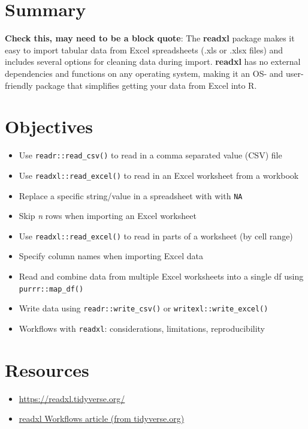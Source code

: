 \documentclass[]{book}
\providecommand{\tightlist}{%
  \setlength{\itemsep}{0pt}\setlength{\parskip}{0pt}}
\begin{document}
\hypertarget{summary}{%
\section{Summary}\label{summary}}

\textbf{Check this, may need to be a block quote}: The \textbf{readxl} package makes it easy to import tabular data from Excel spreadsheets (.xls or .xlsx files) and includes several options for cleaning data during import. \textbf{readxl} has no external dependencies and functions on any operating system, making it an OS- and user-friendly package that simplifies getting your data from Excel into R.

\hypertarget{objectives}{%
\section{Objectives}\label{objectives}}

\begin{itemize}
\tightlist
\item
  Use \texttt{readr::read\_csv()} to read in a comma separated value (CSV) file
\item
  Use \texttt{readxl::read\_excel()} to read in an Excel worksheet from a workbook
\item
  Replace a specific string/value in a spreadsheet with with \texttt{NA}
\item
  Skip \emph{n} rows when importing an Excel worksheet
\item
  Use \texttt{readxl::read\_excel()} to read in parts of a worksheet (by cell range)
\item
  Specify column names when importing Excel data
\item
  Read and combine data from multiple Excel worksheets into a single df using \texttt{purrr::map\_df()}
\item
  Write data using \texttt{readr::write\_csv()} or \texttt{writexl::write\_excel()}
\item
  Workflows with \texttt{readxl}: considerations, limitations, reproducibility
\end{itemize}

\hypertarget{resources-1}{%
\section{Resources}\label{resources-1}}

\begin{itemize}
\tightlist
\item
  \url{https://readxl.tidyverse.org/}
\item
  \href{https://readxl.tidyverse.org/articles/articles/readxl-workflows.html}{readxl Workflows article (from tidyverse.org)}
\end{itemize}
\end{document}
